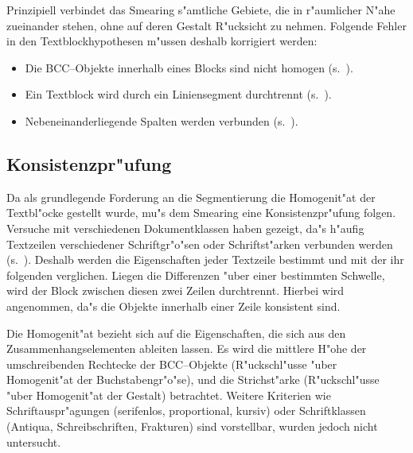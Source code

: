 Prinzipiell verbindet das Smearing s"amtliche Gebiete, die in r"aumlicher N"ahe zueinander
stehen, ohne auf deren Gestalt R"ucksicht zu nehmen.
Folgende Fehler in den Textblockhypothesen m"ussen deshalb korrigiert werden:
\begin{itemize}
  \item Die BCC--Objekte innerhalb eines Blocks sind nicht homogen
        (s.\ ).
  \item Ein Textblock wird durch ein Liniensegment durchtrennt (s.\ ).
  \item Nebeneinanderliegende Spalten werden verbunden (s.\ ).
\end{itemize}

\subsection{Konsistenzpr"ufung}\label{Konsistenzpruefung}

Da als grundlegende Forderung an die Segmentierung die Homogenit"at der
Textbl"ocke gestellt wurde, mu"s dem Smearing eine Konsistenzpr"ufung folgen. Versuche mit
verschiedenen Dokumentklassen haben gezeigt, da"s h"aufig Textzeilen verschiedener
Schriftgr"o"sen oder Schriftst"arken verbunden werden (s.\ ). Deshalb
werden die Eigenschaften jeder Textzeile bestimmt und mit der ihr folgenden verglichen.
Liegen die Differenzen "uber einer bestimmten Schwelle, wird der Block zwischen diesen zwei
Zeilen durchtrennt. Hierbei wird angenommen, da"s die Objekte innerhalb einer Zeile
konsistent sind.


Die Homogenit"at bezieht sich auf die Eigenschaften, die sich
aus den Zusammenhangselementen ableiten lassen. Es wird die mittlere H"ohe der
umschreibenden Rechtecke der BCC--Objekte (R"uckschl"usse "uber Homogenit"at der Buchstabengr"o"se),
und die Strichst"arke (R"uckschl"usse "uber Homogenit"at der Gestalt) betrachtet. Weitere Kriterien
wie Schriftauspr"agungen (serifenlos, proportional, kursiv) oder Schriftklassen
(Antiqua, Schreibschriften, Frakturen) sind vorstellbar, wurden jedoch nicht untersucht.

